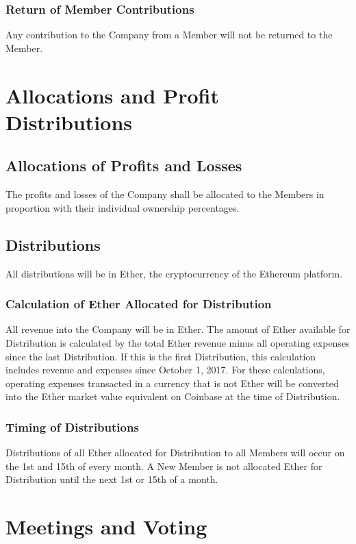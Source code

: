 \documentclass[11pt]{article}
\begin{document}
\subsubsection{Return of Member Contributions}
Any contribution to the Company from a Member will not be returned to the Member.

\section{Allocations and Profit Distributions}

\subsection{Allocations of Profits and Losses}
The profits and losses of the Company shall be allocated to the Members in proportion with their individual ownership percentages.

\subsection{Distributions}
All distributions will be in Ether, the cryptocurrency of the Ethereum platform.

\subsubsection{Calculation of Ether Allocated for Distribution}
All revenue into the Company will be in Ether. The amount of Ether available for Distribution is calculated by the total Ether revenue minus all operating expenses since the last Distribution. If this is the first Distribution, this calculation includes revenue and expenses since October 1, 2017. For these calculations, operating expenses transacted in a currency that is not Ether will be converted into the Ether market value equivalent on Coinbase at the time of Distribution.

\subsubsection{Timing of Distributions}
Distributions of all Ether allocated for Distribution to all Members will occur on the 1st and 15th of every month. A New Member is not allocated Ether for Distribution until the next 1st or 15th of a month.

\section{Meetings and Voting}
\end{document}
